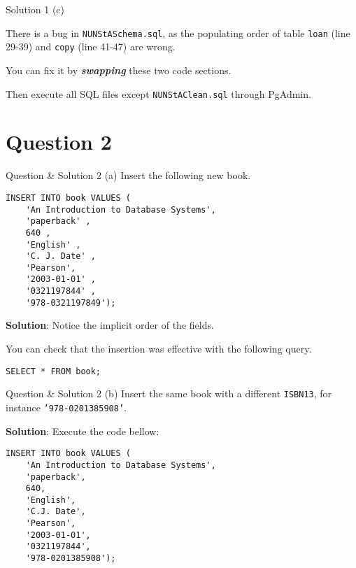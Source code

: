 \begin{frame}[fragile]{Solution 1 (c)}

There is a bug in \texttt{NUNStASchema.sql}, as the populating order of table \texttt{loan} (line 29-39) and \texttt{copy} (line 41-47) are wrong. \vspace{10pt}

You can fix it by \textbf{\textit{swapping}} these two code sections.\vspace{10pt}

Then execute all SQL files except \texttt{NUNStAClean.sql} through PgAdmin.
\end{frame}

\section*{Question 2}

\begin{frame}[fragile]{Question \& Solution 2 (a)}
Insert the following new book.

\begin{lstlisting}
INSERT INTO book VALUES (
	'An Introduction to Database Systems',
	'paperback' , 
	640 , 
	'English' , 
	'C. J. Date' , 
	'Pearson',
	'2003-01-01' , 
	'0321197844' , 
	'978-0321197849');
\end{lstlisting} 


\textbf{Solution}: Notice the implicit order of the fields.

You can check that the insertion was effective with the following query.
\begin{lstlisting}
SELECT * FROM book;
\end{lstlisting}

\end{frame}

\begin{frame}[fragile]{Question \& Solution 2 (b)}
Insert the same book with a different \texttt{ISBN13}, for instance \texttt{'978-0201385908'}. \vspace{10pt}

\textbf{Solution}: Execute the code bellow:

\begin{lstlisting}
INSERT INTO book VALUES (
	'An Introduction to Database Systems', 
	'paperback', 
	640,
	'English',
	'C.J. Date', 
	'Pearson', 
	'2003-01-01', 
	'0321197844',  
	'978-0201385908');
\end{lstlisting}

\end{frame}

